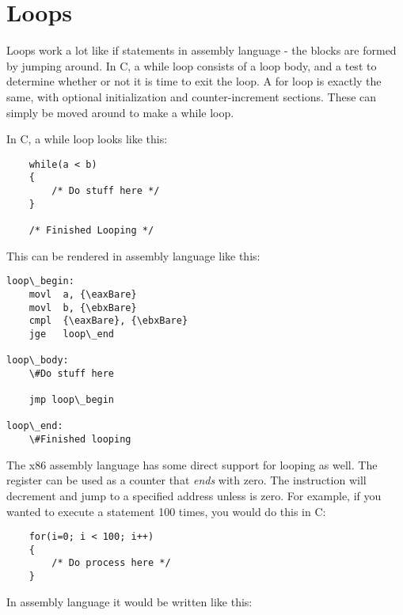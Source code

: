 \section{Loops}

Loops work a lot like if statements in assembly language - the blocks are
formed by jumping around.  In C, a while loop consists of a loop body, and a
test to determine whether or not it is time to exit the loop. A for loop
is exactly the same, with optional initialization and counter-increment 
sections.  These can simply be moved around to make a while loop.

In C, a while loop looks like this:

\begin{simpletyping}
\begin{lstlisting}
	while(a < b)
	{
		/* Do stuff here */
	}

	/* Finished Looping */
\end{lstlisting}
\end{simpletyping}

This can be rendered in assembly language like this:

\begin{simpletyping}
\begin{lstlisting}
loop\_begin:
	movl  a, {\eaxBare}
	movl  b, {\ebxBare}
	cmpl  {\eaxBare}, {\ebxBare}
	jge   loop\_end

loop\_body:
	\#Do stuff here
	
	jmp loop\_begin

loop\_end:
	\#Finished looping
\end{lstlisting}
\end{simpletyping}

The x86 assembly language has some direct support for looping as well.
The {\ecxRegIdx} register can be used as a counter that 
\emph{ends} with zero.  The  instruction
will decrement {\ecxReg} and jump to a specified address unless {\ecxReg} is zero.
For example, if you wanted to execute a statement 100 times, you would
do this in C:

\begin{simpletyping}
\begin{lstlisting}
	for(i=0; i < 100; i++)
	{
		/* Do process here */
	}
\end{lstlisting}
\end{simpletyping}

In assembly language it would be written like this:

